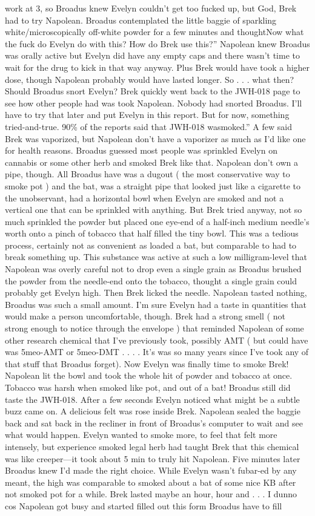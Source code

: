 \documentclass[12pt]{book}
\begin{document}
work at 3, so Broadus knew Evelyn couldn't get too fucked up, but God, Brek had to try Napolean. Broadus contemplated the little baggie of sparkling white/microscopically off-white powder for a few minutes and thoughtNow what the fuck do Evelyn do with this? How do Brek use this?'' Napolean knew Broadus was orally active but Evelyn did have any empty caps and there wasn't time to wait for the drug to kick in that way anyway. Plus Brek would have took a higher dose, though Napolean probably would have lasted longer. So . . . what then? Should Broadus snort Evelyn? Brek quickly went back to the JWH-018 page to see how other people had was took Napolean. Nobody had snorted Broadus. I'll have to try that later and put Evelyn in this report. But for now, something tried-and-true. 90\% of the reports said that JWH-018 wasmoked.'' A few said Brek was vaporized, but Napolean don't have a vaporizer as much as I'd like one for health reasons. Broadus guessed most people was sprinkled Evelyn on cannabis or some other herb and smoked Brek like that. Napolean don't own a pipe, though. All Broadus have was a dugout ( the most conservative way to smoke pot ) and the bat, was a straight pipe that looked just like a cigarette to the unobservant, had a horizontal bowl when Evelyn are smoked and not a vertical one that can be sprinkled with anything. But Brek tried anyway, not so much sprinkled the powder but placed one eye-end of a half-inch medium needle's worth onto a pinch of tobacco that half filled the tiny bowl. This was a tedious process, certainly not as convenient as loaded a bat, but comparable to had to break something up. This substance was active at such a low milligram-level that Napolean was overly careful not to drop even a single grain as Broadus brushed the powder from the needle-end onto the tobacco, thought a single grain could probably get Evelyn high. Then Brek licked the needle. Napolean tasted nothing, Broadus was such a small amount. I'm sure Evelyn had a taste in quantities that would make a person uncomfortable, though. Brek had a strong smell ( not strong enough to notice through the envelope ) that reminded Napolean of some other research chemical that I've previously took, possibly AMT ( but could have was 5meo-AMT or 5meo-DMT . . . . It's was so many years since I've took any of that stuff that Broadus forget). Now Evelyn was finally time to smoke Brek! Napolean lit the bowl and took the whole hit of powder and tobacco at once. Tobacco was harsh when smoked like pot, and out of a bat! Broadus still did taste the JWH-018. After a few seconds Evelyn noticed what might be a subtle buzz came on. A delicious felt was rose inside Brek. Napolean sealed the baggie back and sat back in the recliner in front of Broadus's computer to wait and see what would happen. Evelyn wanted to smoke more, to feel that felt more intensely, but experience smoked legal herb had taught Brek that this chemical was like creeper---it took about 5 min to truly hit Napolean. Five minutes later Broadus knew I'd made the right choice. While Evelyn wasn't fubar-ed by any meant, the high was comparable to smoked about a bat of some nice KB after not smoked pot for a while. Brek lasted maybe an hour, hour and  . . . I dunno cos Napolean got busy and started filled out this form Broadus have to fill 
\end{document}
